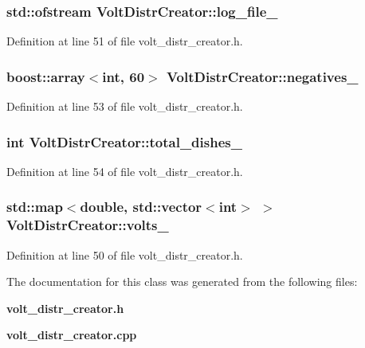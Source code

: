 \subsubsection[{log\-\_\-file\-\_\-}]{\setlength{\rightskip}{0pt plus 5cm}std\-::ofstream {\bf \-Volt\-Distr\-Creator\-::log\-\_\-file\-\_\-}\hspace{0.3cm}{\ttfamily  [private]}}\label{classVoltDistrCreator_a981df09a8cfd8b196b0ba37898405891}


\-Definition at line 51 of file volt\-\_\-distr\-\_\-creator.\-h.

\subsubsection[{negatives\-\_\-}]{\setlength{\rightskip}{0pt plus 5cm}boost\-::array$<$int, 60$>$ {\bf \-Volt\-Distr\-Creator\-::negatives\-\_\-}\hspace{0.3cm}{\ttfamily  [private]}}\label{classVoltDistrCreator_a6485760555518275cbd98cad32eb80b4}


\-Definition at line 53 of file volt\-\_\-distr\-\_\-creator.\-h.

\subsubsection[{total\-\_\-dishes\-\_\-}]{\setlength{\rightskip}{0pt plus 5cm}int {\bf \-Volt\-Distr\-Creator\-::total\-\_\-dishes\-\_\-}\hspace{0.3cm}{\ttfamily  [private]}}\label{classVoltDistrCreator_acdee717646fde35c4c405ed6eefd8590}


\-Definition at line 54 of file volt\-\_\-distr\-\_\-creator.\-h.

\subsubsection[{volts\-\_\-}]{\setlength{\rightskip}{0pt plus 5cm}std\-::map$<$double, std\-::vector$<$int$>$ $>$ {\bf \-Volt\-Distr\-Creator\-::volts\-\_\-}\hspace{0.3cm}{\ttfamily  [private]}}\label{classVoltDistrCreator_a3aa508e2444509a3b6879099786fd165}


\-Definition at line 50 of file volt\-\_\-distr\-\_\-creator.\-h.



\-The documentation for this class was generated from the following files\-:\begin{DoxyCompactItemize}
\item 
{\bf volt\-\_\-distr\-\_\-creator.\-h}\item 
{\bf volt\-\_\-distr\-\_\-creator.\-cpp}\end{DoxyCompactItemize}
